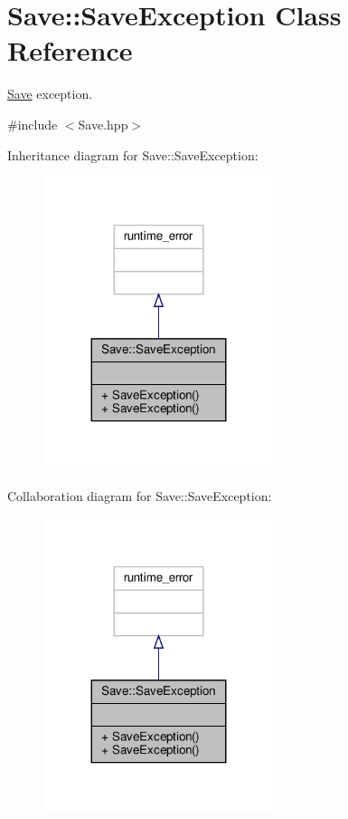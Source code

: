 \hypertarget{class_save_1_1_save_exception}{}\section{Save\+:\+:Save\+Exception Class Reference}
\label{class_save_1_1_save_exception}


\hyperlink{class_save}{Save} exception.  




{\ttfamily \#include $<$Save.\+hpp$>$}



Inheritance diagram for Save\+:\+:Save\+Exception\+:
\nopagebreak
\begin{figure}[H]
\begin{center}
\leavevmode
\includegraphics[width=191pt]{class_save_1_1_save_exception__inherit__graph}
\end{center}
\end{figure}


Collaboration diagram for Save\+:\+:Save\+Exception\+:
\nopagebreak
\begin{figure}[H]
\begin{center}
\leavevmode
\includegraphics[width=191pt]{class_save_1_1_save_exception__coll__graph}
\end{center}
\end{figure}
